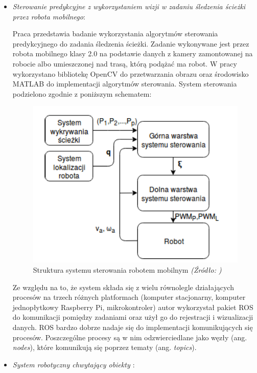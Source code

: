 \documentclass[a4paper, 12pt, twoside]{article}
\begin{document}
\begin{itemize}
\item \textit{Sterowanie predykcyjne z wykorzystaniem wizji w zadaniu śledzenia ścieżki przez robota mobilnego\cite{thesismeyer}}: 

Praca przedstawia badanie wykorzystania algorytmów sterowania predykcyjnego do zadania śledzenia ścieżki. Zadanie wykonywane jest przez robota mobilnego klasy 2.0 na podstawie danych z kamery zamontowanej na robocie albo umieszczonej nad trasą, którą podążać ma robot. W pracy wykorzystano bibliotekę OpenCV do przetwarzania obrazu oraz środowisko MATLAB do implementacji algorytmów sterowania. System sterowania podzielono zgodnie z poniższym schematem:

\begin{figure}[hbt!]
\centering
\includegraphics[width=0.8\linewidth]{images/mobile_robot_system.png}
\caption{Struktura systemu sterowania robotem mobilnym\textit{ (Źródło: \cite{thesismeyer}) } }
\label{fig:mobile_robot_scheme}
\end{figure}

Ze względu na to, że system składa się z wielu równolegle działających procesów na trzech różnych platformach (komputer stacjonarny, komputer jednopłytkowy Raspberry Pi, mikrokontroler) autor wykorzystał pakiet ROS do komunikacji pomiędzy zadaniami oraz użył go do rejestracji i wizualizacji danych. ROS bardzo dobrze nadaje się do implementacji komunikujących się procesów. Poszczególne procesy są w nim odzwierciedlane jako węzły (ang. \textit{nodes}), które komunikują się poprzez tematy (ang. \textit{topics}).

\item \textit{System robotyczny chwytający obiekty \cite{thesiskarbarczyk}}:


\end{itemize}
\end{document}
